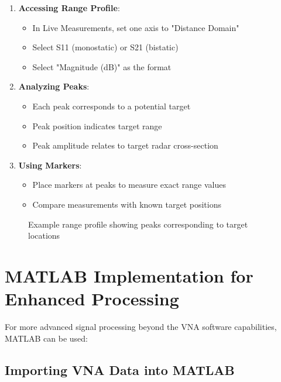 \documentclass[12pt,a4paper]{article}
\begin{document}
\begin{enumerate}
    \item \textbf{Accessing Range Profile}:
    \begin{itemize}
        \item In Live Measurements, set one axis to "Distance Domain"
        \item Select S11 (monostatic) or S21 (bistatic)
        \item Select "Magnitude (dB)" as the format
    \end{itemize}
    
    \item \textbf{Analyzing Peaks}:
    \begin{itemize}
        \item Each peak corresponds to a potential target
        \item Peak position indicates target range
        \item Peak amplitude relates to target radar cross-section
    \end{itemize}
    
    \item \textbf{Using Markers}:
    \begin{itemize}
        \item Place markers at peaks to measure exact range values
        \item Compare measurements with known target positions
    \end{itemize}
\end{enumerate}

\begin{figure}[H]
    \centering
    \caption{Example range profile showing peaks corresponding to target locations}
    \label{fig:range_profile}
\end{figure}

\section{MATLAB Implementation for Enhanced Processing}

For more advanced signal processing beyond the VNA software capabilities, MATLAB can be used:

\subsection{Importing VNA Data into MATLAB}
\end{document}
